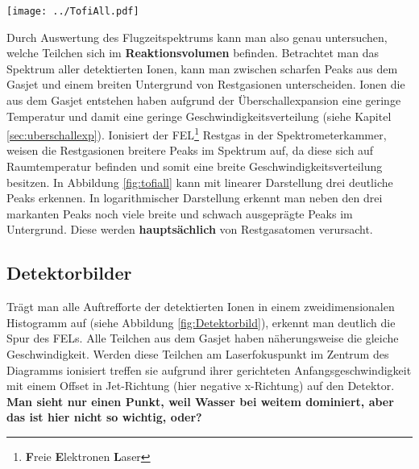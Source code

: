 \begin{center}
\begin{minipage}{\linewidth}
\centering
\texttt{[image: ../TofiAll.pdf]}%
 \label{fig:tofiall}
\end{minipage} 
\end{center} 
Durch Auswertung des Flugzeitspektrums kann man also genau untersuchen, welche Teilchen sich im \textbf{Reaktionsvolumen} befinden. Betrachtet man das Spektrum aller detektierten Ionen, kann man zwischen scharfen Peaks aus dem Gasjet und einem breiten Untergrund von Restgasionen unterscheiden. Ionen die aus dem Gasjet entstehen haben aufgrund der Überschallexpansion eine geringe Temperatur und damit eine geringe Geschwindigkeitsverteilung (siehe Kapitel \ref{sec:uberschallexp}). Ionisiert der FEL\footnote{\textbf{F}reie \textbf{E}lektronen \textbf{L}aser} Restgas in der Spektrometerkammer, weisen die Restgasionen breitere Peaks im Spektrum auf, da diese sich auf Raumtemperatur befinden und somit eine breite Geschwindigkeitsverteilung besitzen. In Abbildung \ref{fig:tofiall} kann mit linearer Darstellung drei deutliche Peaks erkennen. In logarithmischer Darstellung erkennt man neben den drei markanten Peaks noch viele breite und schwach ausgeprägte Peaks im Untergrund. Diese werden \textbf{hauptsächlich} von Restgasatomen verursacht.
\subsection{Detektorbilder}

Trägt man alle Auftrefforte der detektierten Ionen in einem zweidimensionalen Histogramm auf (siehe Abbildung \ref{fig:Detektorbild}), erkennt man deutlich die Spur des FELs. Alle Teilchen aus dem Gasjet haben näherungsweise die gleiche Geschwindigkeit. Werden diese Teilchen am Laserfokuspunkt im Zentrum des Diagramms ionisiert treffen sie aufgrund ihrer gerichteten Anfangsgeschwindigkeit mit einem Offset in Jet-Richtung (hier negative x-Richtung) auf den Detektor. \textbf{Man sieht nur einen Punkt, weil Wasser bei weitem dominiert, aber das ist hier nicht so wichtig, oder?}


